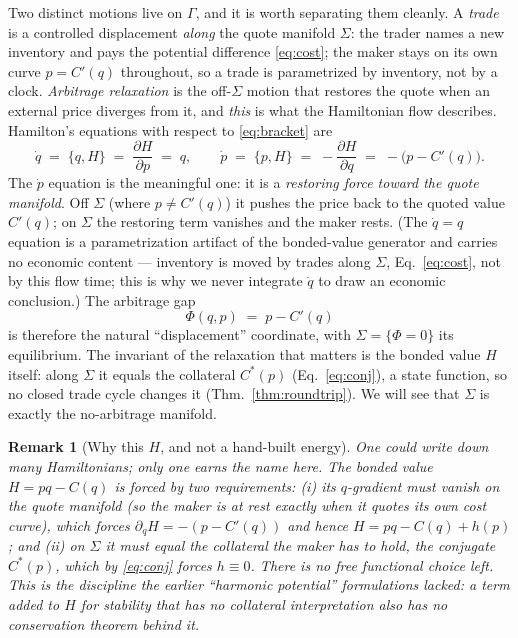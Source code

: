 \documentclass[11pt]{article}
\newtheorem{remark}{Remark}
\newcommand{\Cstar}{\ensuremath{C^{*}}}
\begin{document}
Two distinct motions live on $\Gamma$, and it is worth separating them cleanly. A
\emph{trade} is a controlled displacement \emph{along} the quote manifold $\Sigma$:
the trader names a new inventory and pays the potential difference
\eqref{eq:cost}; the maker stays on its own curve $p=C'(q)$ throughout, so a trade
is parametrized by inventory, not by a clock. \emph{Arbitrage relaxation} is the
off-$\Sigma$ motion that restores the quote when an external price diverges from
it, and \emph{this} is what the Hamiltonian flow describes. Hamilton's equations
with respect to \eqref{eq:bracket} are
\begin{equation}
\dot q \;=\; \{q,H\} \;=\; \frac{\partial H}{\partial p} \;=\; q,
\qquad
\dot p \;=\; \{p,H\} \;=\; -\frac{\partial H}{\partial q}
          \;=\; -\big(p - C'(q)\big).
\label{eq:eom}
\end{equation}
The $\dot p$ equation is the meaningful one: it is a \emph{restoring force toward
the quote manifold}. Off $\Sigma$ (where $p\neq C'(q)$) it pushes the price back to
the quoted value $C'(q)$; on $\Sigma$ the restoring term vanishes and the maker
rests. (The $\dot q=q$ equation is a parametrization artifact of the bonded-value
generator and carries no economic content --- inventory is moved by trades along
$\Sigma$, Eq.~\eqref{eq:cost}, not by this flow time; this is why we never integrate
$\dot q$ to draw an economic conclusion.) The arbitrage gap
\begin{equation}
\Phi(q,p) \;=\; p - C'(q)
\label{eq:gap}
\end{equation}
is therefore the natural ``displacement'' coordinate, with $\Sigma = \{\Phi = 0\}$
its equilibrium. The invariant of the relaxation that matters is the bonded value
$H$ itself: along $\Sigma$ it equals the collateral $\Cstar(p)$
(Eq.~\eqref{eq:conj}), a state function, so no closed trade cycle changes it
(Thm.~\ref{thm:roundtrip}). We will see that $\Sigma$ is exactly the no-arbitrage
manifold.

\begin{remark}[Why this $H$, and not a hand-built energy]
\label{rem:why}
One could write down many Hamiltonians; only one earns the name here. The bonded
value $H=pq-C(q)$ is forced by two requirements: (i) its $q$-gradient must vanish
on the quote manifold (so the maker is at rest exactly when it quotes its own cost
curve), which forces $\partial_q H = -(p-C'(q))$ and hence $H = pq - C(q) + h(p)$;
and (ii) on $\Sigma$ it must equal the collateral the maker has to hold, the
conjugate $\Cstar(p)$, which by \eqref{eq:conj} forces $h\equiv 0$. There is no
free functional choice left. This is the discipline the earlier ``harmonic
potential'' formulations lacked: a term added to $H$ for stability that has no
collateral interpretation also has no conservation theorem behind it.
\end{remark}
\end{document}
